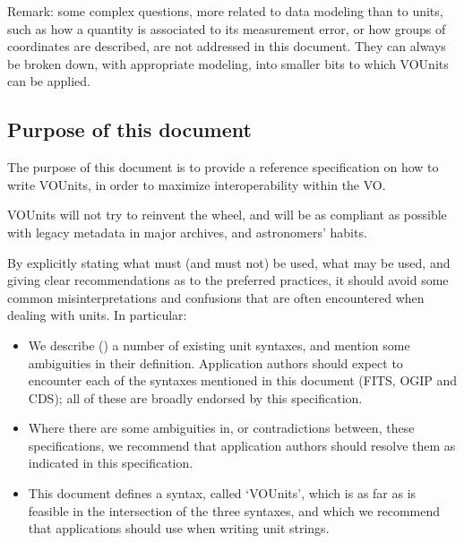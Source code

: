 \documentclass[12pt,notitlepage,onecolumn]{ivoa}
\begin{document}
Remark: some complex questions, more related to data modeling than to units, such as how a quantity 
is associated to its measurement error, or how groups of coordinates are described, are not addressed in this
document. They can always be broken down, with appropriate modeling, into smaller bits to which VOUnits can
be applied.


\subsection{Purpose of this document}
\label{sec:purpose}

The purpose of this document is to provide a reference specification on how
to write VOUnits, in order to maximize interoperability within the VO. 

VOUnits will not try to reinvent the wheel, and will be as compliant as possible with
legacy metadata in major archives, and astronomers' habits.

By explicitly stating what must (and must not) be used, what may be used, and
giving clear recommendations as to the preferred practices, it should avoid some
common misinterpretations and confusions that are often encountered when dealing with
units.
In particular:
\begin{itemize}
\item We describe () a number of existing unit
  syntaxes, and mention some ambiguities in their
  definition. Application authors should expect to encounter each of
  the syntaxes mentioned in this document (FITS, OGIP and CDS); all of
  these are broadly endorsed by this specification.
\item Where there are some ambiguities in, or contradictions between,
  these specifications, we recommend that application authors should
  resolve them as indicated in this specification.  
\item This document defines a syntax, called `VOUnits', which is as
  far as is feasible in the intersection of the three syntaxes, and
  which we recommend that applications should use when writing unit strings.
\end{itemize}

\end{document}

